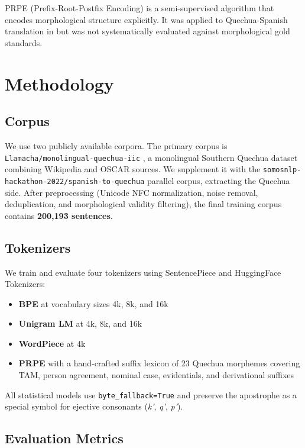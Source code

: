 \documentclass[11pt]{article}
\begin{document}
PRPE (Prefix-Root-Postfix Encoding) \cite{zuters2018} is a semi-supervised algorithm that encodes morphological structure explicitly. It was applied to Quechua-Spanish translation in \citet{oncevay2021} but was not systematically evaluated against morphological gold standards.

\section{Methodology}

\subsection{Corpus}

We use two publicly available corpora. The primary corpus is \texttt{Llamacha/monolingual-quechua-iic} \cite{zevallos2022}, a monolingual Southern Quechua dataset combining Wikipedia and OSCAR sources. We supplement it with the \texttt{somosnlp-hackathon-2022/spanish-to-quechua} parallel corpus, extracting the Quechua side. After preprocessing (Unicode NFC normalization, noise removal, deduplication, and morphological validity filtering), the final training corpus contains \textbf{200,193 sentences}.

\subsection{Tokenizers}

We train and evaluate four tokenizers using SentencePiece \cite{kudo2018sp} and HuggingFace Tokenizers:

\begin{itemize}
    \item \textbf{BPE} at vocabulary sizes 4k, 8k, and 16k
    \item \textbf{Unigram LM} at 4k, 8k, and 16k
    \item \textbf{WordPiece} at 4k
    \item \textbf{PRPE} with a hand-crafted suffix lexicon of 23 Quechua morphemes covering TAM, person agreement, nominal case, evidentials, and derivational suffixes
\end{itemize}

All statistical models use \texttt{byte\_fallback=True} and preserve the apostrophe as a special symbol for ejective consonants (\textit{k'}, \textit{q'}, \textit{p'}).

\subsection{Evaluation Metrics}
\end{document}
